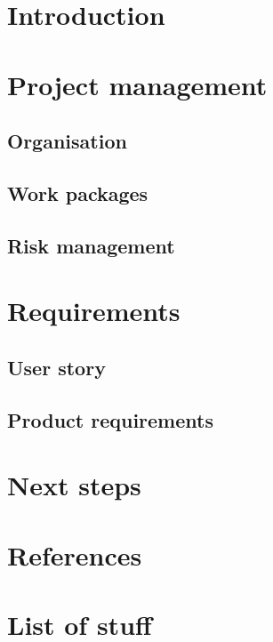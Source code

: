 \documentclass{article}
\begin{document}
\tableofcontents
\newpage

\section{Introduction}

\section{Project management}

\subsection{Organisation}

\subsection{Work packages}

\subsection{Risk management}

\section{Requirements}

\subsection{User story}

\subsection{Product requirements}

\section{Next steps}

\section{References}

\appendix
\section{List of stuff}
\end{document}
